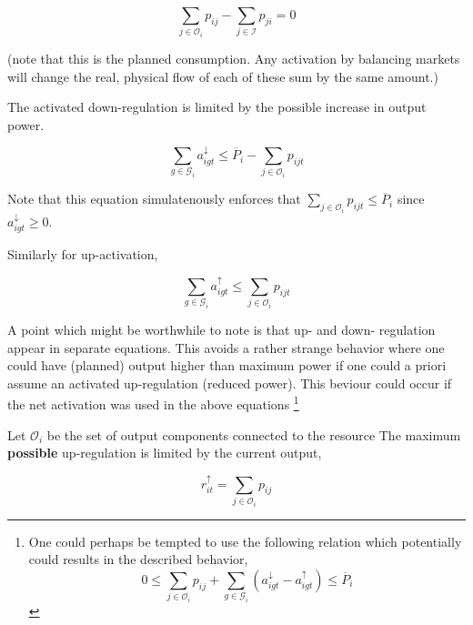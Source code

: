 \documentclass[]{report}
\renewcommand{\emph}{\textbf}
\newcommand{\groups}{\mathcal{G}}
\newcommand{\outputs}{\mathcal{O}}
\newcommand{\inputs}{\mathcal{I}}
\newcommand{\pmax}{\overline{P}}
\newcommand{\aup}{a^{\uparrow}}
\newcommand{\adown}{a^{\downarrow}}
\begin{document}
\begin{equation}
    \label{const:simplecharger-energybalance}
    \sum_{j \in \outputs_i} p_{ij} - \sum_{j \in \inputs} p_{ji} = 0
\end{equation}

(note that this is the planned consumption. Any activation by balancing markets will change the real, physical flow of each of these sum by the same amount.)

The activated down-regulation is limited by the possible increase in output power.

\begin{equation}
    \sum_{g \in \groups_i}\adown_{igt} \leq \pmax_i - \sum_{j \in \outputs_i} p_{ijt}
\end{equation}

Note that this equation simulatenously enforces that $\sum_{j \in \outputs_i} p_{ijt} \leq \pmax_i$ since  $\adown_{igt} \geq 0$.

Similarly for up-activation,

\begin{equation}
    \sum_{g \in \groups_i}\aup_{igt} \leq \sum_{j \in \outputs_i} p_{ijt}
\end{equation}

A point which might be worthwhile to note is that up- and down- regulation appear in separate equations. This avoids a rather strange behavior where one could have (planned) output higher than maximum power if one could a priori assume an activated up-regulation (reduced power). This beviour could occur if the net activation was used in the above equations
\footnote{One could perhaps be tempted to use the following relation which potentially could results in the described behavior,
\begin{equation}
    0 \leq \sum_{j \in \outputs_i} p_{ij} + \sum_{g \in \groups_i} \left(\adown_{igt} - \aup_{igt}\right) \leq \pmax_i
\end{equation}
}

Let $\outputs_i$ be the set of output components connected to the resource %
The maximum \emph{possible} up-regulation is limited by the current output,

\begin{equation}
    \label{eq:charger-up-capacity}
    r^{\uparrow}_{it} = \sum_{j \in \outputs_i} p_{ij}
\end{equation}
\end{document}

